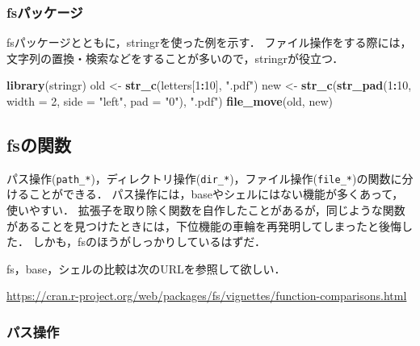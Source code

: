 \documentclass[
]{article}
\newenvironment{Shaded}{\begin{snugshade}}{\end{snugshade}}
\newcommand{\AttributeTok}[1]{\textcolor[rgb]{0.13,0.29,0.53}{#1}}
\newcommand{\DecValTok}[1]{\textcolor[rgb]{0.00,0.00,0.81}{#1}}
\newcommand{\FunctionTok}[1]{\textcolor[rgb]{0.13,0.29,0.53}{\textbf{#1}}}
\newcommand{\NormalTok}[1]{#1}
\newcommand{\OtherTok}[1]{\textcolor[rgb]{0.56,0.35,0.01}{#1}}
\newcommand{\SpecialCharTok}[1]{\textcolor[rgb]{0.81,0.36,0.00}{\textbf{#1}}}
\newcommand{\StringTok}[1]{\textcolor[rgb]{0.31,0.60,0.02}{#1}}
\begin{document}
\hypertarget{fsux30d1ux30c3ux30b1ux30fcux30b8}{%
\subsubsection{fsパッケージ}\label{fsux30d1ux30c3ux30b1ux30fcux30b8}}

fsパッケージとともに，stringrを使った例を示す．
ファイル操作をする際には，文字列の置換・検索などをすることが多いので，stringrが役立つ．

\begin{Shaded}
\begin{Highlighting}[]
\FunctionTok{library}\NormalTok{(stringr)}
\NormalTok{old }\OtherTok{\textless{}{-}} \FunctionTok{str\_c}\NormalTok{(letters[}\DecValTok{1}\SpecialCharTok{:}\DecValTok{10}\NormalTok{], }\StringTok{".pdf"}\NormalTok{)}
\NormalTok{new }\OtherTok{\textless{}{-}} \FunctionTok{str\_c}\NormalTok{(}\FunctionTok{str\_pad}\NormalTok{(}\DecValTok{1}\SpecialCharTok{:}\DecValTok{10}\NormalTok{, }\AttributeTok{width =} \DecValTok{2}\NormalTok{, }\AttributeTok{side =} \StringTok{"left"}\NormalTok{, }\AttributeTok{pad =} \StringTok{"0"}\NormalTok{), }\StringTok{".pdf"}\NormalTok{)}
\FunctionTok{file\_move}\NormalTok{(old, new)}
\end{Highlighting}
\end{Shaded}

\hypertarget{fsux306eux95a2ux6570}{%
\subsection{fsの関数}\label{fsux306eux95a2ux6570}}

パス操作(\texttt{path\_*})，ディレクトリ操作(\texttt{dir\_*})，ファイル操作(\texttt{file\_*})の関数に分けることができる．
パス操作には，baseやシェルにはない機能が多くあって，使いやすい．
拡張子を取り除く関数を自作したことがあるが，同じような関数があることを見つけたときには，下位機能の車輪を再発明してしまったと後悔した．
しかも，fsのほうがしっかりしているはずだ．

fs，base，シェルの比較は次のURLを参照して欲しい．

\url{https://cran.r-project.org/web/packages/fs/vignettes/function-comparisons.html}

\hypertarget{ux30d1ux30b9ux64cdux4f5c}{%
\subsubsection{パス操作}\label{ux30d1ux30b9ux64cdux4f5c}}
\end{document}
